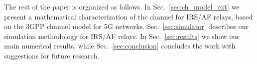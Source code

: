 \def\Var{{\operatorname{Var}}\,}
\def\E{\mathbb{E}\,}

\newcommand{\bigcell}[2]{\begin{tabular}{@{}#1@{}}#2\end{tabular}}

% 
% 

%
%
%
%
%


\def\si{\tikz\fill[scale=0.4](0,.35) -- (.25,0) -- (1,.7) -- (.25,.15) -- cycle;}

    




The rest of the paper is organized as follows. 
In Sec.~\ref{sec:ch_model_ext} we present a mathematical characterization of the channel for IRS/AF relays, based on the 3GPP channel model for 5G networks.
Sec.~\ref{sec:simulator} describes our simulation methodology for IRS/AF relays. %
In Sec.~\ref{sec:results} we show our main numerical results, while Sec.~\ref{sec:conclusion} concludes the work with suggestions for future research.







